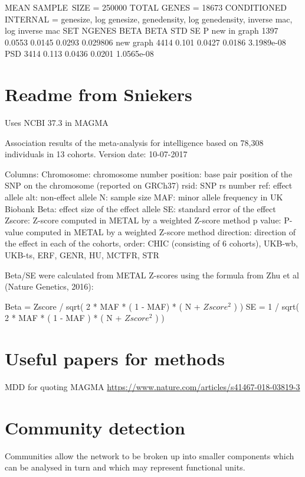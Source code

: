 MEAN SAMPLE\ SIZE = 250000
 TOTAL GENES = 18673
 CONDITIONED INTERNAL = genesize, log genesize, genedensity, log genedensity, inverse mac, log inverse mac
SET           NGENES       BETA   BETA STD         SE            P
new in graph    1397     0.0553     0.0145     0.0293     0.029806
new graph       4414      0.101     0.0427     0.0186   3.1989e-08
PSD             3414      0.113     0.0436     0.0201   1.0565e-08



\section{Readme from Sniekers}
\label{sec:notes readme from sniekers}

Uses NCBI 37.3 in MAGMA

     Association results of the meta-analysis for intelligence based on 78,308 individuals in 13 cohorts. 
     Version date: 10-07-2017

  Columns:
Chromosome: chromosome number
position: base pair position of the SNP on the chromosome (reported on GRCh37)
rsid: SNP rs number
ref: effect allele
alt: non-effect allele
N: sample size
MAF: minor allele frequency in UK Biobank
Beta: effect size of the effect allele
SE: standard error of the effect
Zscore: Z-score computed in METAL by a weighted Z-score method
p   value: P-value computed in METAL by a weighted Z-score method
direction: direction of the effect in each of the cohorts, order: CHIC (consisting of 6 cohorts), UKB-wb, UKB-ts, ERF, GENR, HU, MCTFR, STR

Beta/SE were calculated from METAL Z-scores using the formula from Zhu et al (Nature Genetics, 2016):

Beta = Zscore / sqrt( 2 * MAF * ( 1 - MAF) * ( N + $Zscore^2$ ) )
SE = 1 / sqrt( 2 * MAF * ( 1 - MAF ) * ( N + $Zscore^2$ ) )

\section{Useful papers for methods}

MDD for quoting MAGMA \url{https://www.nature.com/articles/s41467-018-03819-3}

\section{Community detection}

Communities allow the network to be broken up into smaller components which can be analysed in turn and which may represent functional units.


